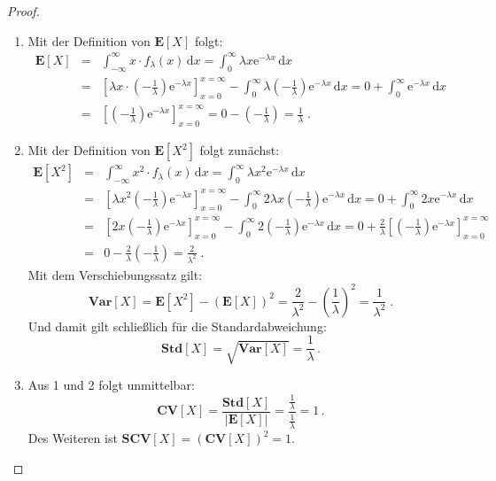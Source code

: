 \documentclass[a4paper,11pt,oneside]{article}
\theoremstyle{definition}
\begin{document}
\begin{proof}
\begin{enumerate}
\item
Mit der Definition von ${\mathbf E}[X]$ folgt:
\begin{eqnarray*}
{\mathbf E}[X]&=&
\int_{-\infty}^\infty x\cdot f_\lambda(x)\,\mbox{d}x=
\int_0^\infty \lambda x \mathrm{e}^{-\lambda x}\,\mbox{d}x\\&=&
\left[\lambda x\cdot\left(-\frac{1}{\lambda}\right)\mathrm{e}^{-\lambda x}\right]_{x=0}^{x=\infty}-
\int_0^\infty \lambda \left(-\frac{1}{\lambda}\right)\mathrm{e}^{-\lambda x}\,\mbox{d}x=
0+\int_0^\infty\mathrm{e}^{-\lambda x}\,\mbox{d}x\\&=&
\left[\left(-\frac{1}{\lambda}\right)\mathrm{e}^{-\lambda x}\right]_{x=0}^{x=\infty}=
0-\left(-\frac{1}{\lambda}\right)=
\frac{1}{\lambda}\;.
\end{eqnarray*}
\item
Mit der Definition von ${\mathbf E}[X^2]$ folgt zunächst:
\begin{eqnarray*}
{\mathbf E}[X^2]&=&
\int_{-\infty}^\infty x^2\cdot f_\lambda(x)\,\mbox{d}x=
\int_0^\infty \lambda x^2 \mathrm{e}^{-\lambda x}\,\mbox{d}x\\&=&
\left[\lambda x^2 \left(-\frac{1}{\lambda}\right)\mathrm{e}^{-\lambda x}\right]_{x=0}^{x=\infty}-
\int_0^\infty 2\lambda x \left(-\frac{1}{\lambda}\right)\mathrm{e}^{-\lambda x}\,\mbox{d}x=
0+\int_0^\infty 2x\mathrm{e}^{-\lambda x}\,\mbox{d}x\\&=&
\left[2x \left(-\frac{1}{\lambda}\right)\mathrm{e}^{-\lambda x}\right]_{x=0}^{x=\infty}-
\int_0^\infty 2\left(-\frac{1}{\lambda}\right)\mathrm{e}^{-\lambda x}\,\mbox{d}x=
0+\frac{2}{\lambda}\left[\left(-\frac{1}{\lambda}\right)\mathrm{e}^{-\lambda x}\right]_{x=0}^{x=\infty}\\&=&
0-\frac{2}{\lambda}\left(-\frac{1}{\lambda}\right)=
\frac{2}{\lambda^2}\;.
\end{eqnarray*}
Mit dem Verschiebungssatz gilt:
$$
\mathbf{Var}[X]={\mathbf E}[X^2]-\left({\mathbf E}[X]\right)^2=\frac{2}{\lambda^2}-\left(\frac{1}{\lambda}\right)^2=\frac{1}{\lambda^2}\;.
$$
Und damit gilt schließlich für die Standardabweichung:
$$
\mathbf{Std}[X]=\sqrt{\mathbf{Var}[X]}=\frac{1}{\lambda}\,.
$$
\item
Aus 1 und 2 folgt unmittelbar:
$$
\mathbf{CV}[X]=\frac{\mathbf{Std}[X]}{|{\mathbf E}[X]|}=\frac{\frac{1}{\lambda}}{\frac{1}{\lambda}}=1\,.
$$
Des Weiteren ist $\mathbf{SCV}[X]=\left(\mathbf{CV}[X]\right)^2=1$.
\end{enumerate}
\end{proof}
\end{document}
